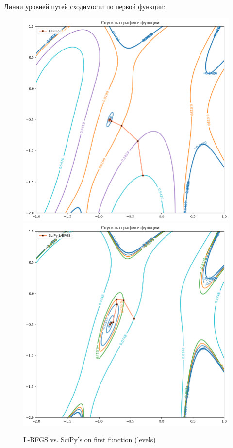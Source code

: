 \documentclass[12pt, a4paper, oneside, final]{article}
\begin{document}
	Линии уровней путей сходимости по первой функции:
	\begin{figure}[H]
		\centering
		\includegraphics[scale = 0.35]{Image/T2A_F1_LBFGS_LEVELS.png}
		\includegraphics[scale = 0.35]{Image/T2A_F1_scipy_LBFGS_LEVELS.png}
		\caption*{L-BFGS vs. SciPy's on first function (levels)}
	\end{figure}
\end{document}
